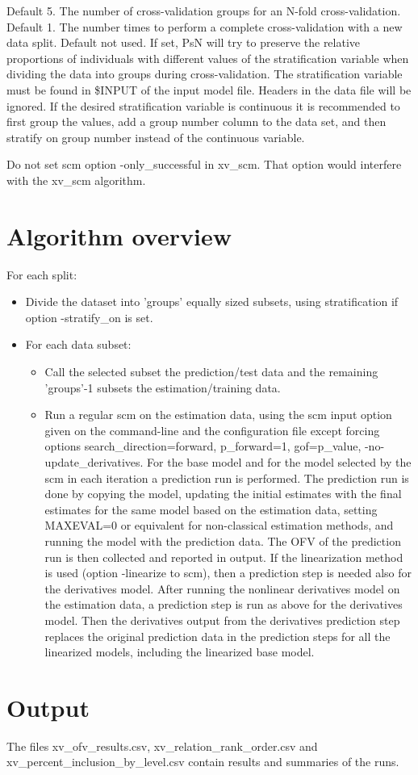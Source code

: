 \begin{optionlist}
Default 5. The number of cross-validation groups for an N-fold cross-validation. 
\nextopt
{}
Default 1. The number times to perform a complete cross-validation with a new data split. 
\nextopt
{}
Default not used. If set, PsN will try to preserve the relative proportions of individuals with different values of the stratification variable when dividing the data into groups during cross-validation. The stratification variable must be found in \$INPUT of the input model file. Headers in the data file will be ignored.
If the desired stratification variable is continuous it is recommended to first group the values,
add a group number column to the data set,
and then stratify on group number instead of the continuous variable. 
\nextopt
\end{optionlist}

Do not set scm option -only\_successful in xv\_scm. That option would interfere with the xv\_scm algorithm.


\section{Algorithm overview}

For each split: 
\begin{itemize}
\item[] Divide the dataset into 'groups' equally sized subsets, using stratification if option -stratify\_on is set.
\item[] For each data subset: 
\begin{itemize}
\item[] Call the selected subset the prediction/test data and the remaining 'groups'-1 subsets the estimation/training data. 
\item[] Run a regular scm on the estimation data, using the scm input option given on the command-line and the configuration file except forcing options search\_direction=forward, p\_forward=1,  gof=p\_value, -no-update\_derivatives. For the base model and for the model selected by the scm in each iteration a  prediction run is performed. The prediction run is  done by copying the model, updating the initial estimates with the final estimates for the same model based on the estimation data, setting MAXEVAL=0 or equivalent for non-classical estimation methods, and running the model with the prediction data. The OFV of the prediction run is then collected and reported in output.
If the linearization method is used (option -linearize to scm), then a prediction step is needed also for the derivatives model. After running the nonlinear derivatives model on the estimation data, a prediction step is run as above for the derivatives model. Then the derivatives output from the derivatives prediction step replaces the original prediction data in the prediction steps for all the linearized models, including the linearized base model.
\end{itemize}
\end{itemize}
\section{Output}
The files xv\_ofv\_results.csv,  xv\_relation\_rank\_order.csv and xv\_percent\_inclusion\_by\_level.csv contain results and summaries of the runs.



